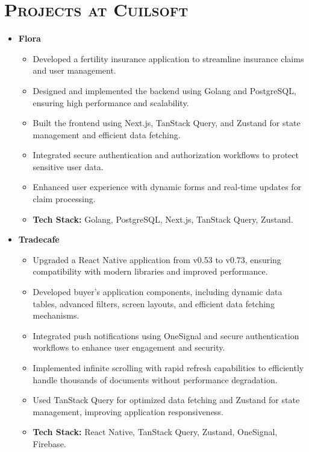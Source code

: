 \documentclass[a4paper,10pt]{article}
\newcommand{\resumesection}[1]{\section*{\scshape{#1}}}
\begin{document}
\resumesection{Projects at Cuilsoft}
\begin{itemize}[leftmargin=0.5cm]
    \item \textbf{Flora}
    \begin{itemize}
       \item Developed a fertility insurance application to streamline insurance claims and user management.
       \item Designed and implemented the backend using Golang and PostgreSQL, ensuring high performance and scalability.
       \item Built the frontend using Next.js, TanStack Query, and Zustand for state management and efficient data fetching.
       \item Integrated secure authentication and authorization workflows to protect sensitive user data.
       \item Enhanced user experience with dynamic forms and real-time updates for claim processing.
       \item \textbf{Tech Stack:} Golang, PostgreSQL, Next.js, TanStack Query, Zustand.
    \end{itemize}

    \item \textbf{Tradecafe}
    \begin{itemize}
       \item Upgraded a React Native application from v0.53 to v0.73, ensuring compatibility with modern libraries and improved performance.
       \item Developed buyer's application components, including dynamic data tables, advanced filters, screen layouts, and efficient data fetching mechanisms.
       \item Integrated push notifications using OneSignal and secure authentication workflows to enhance user engagement and security.
       \item Implemented infinite scrolling with rapid refresh capabilities to efficiently handle thousands of documents without performance degradation.
       \item Used TanStack Query for optimized data fetching and Zustand for state management, improving application responsiveness.
       \item \textbf{Tech Stack:} React Native, TanStack Query, Zustand, OneSignal, Firebase.
    \end{itemize}
    

\end{itemize}
\end{document}
